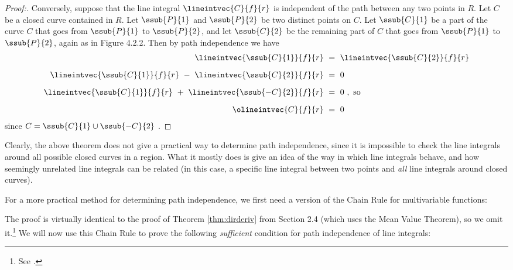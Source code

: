\begin{proof}[Proof:]
 \par\vspace{-15mm}
 Conversely, suppose that the line integral $\lineintvec{C}{f}{r}$ is independent of the path
 between any two points in $R$. Let $C$ be a closed curve contained in $R$. Let $\ssub{P}{1}$ and $\ssub{P}{2}$ be two
 distinct points on $C$. Let $\ssub{C}{1}$ be a part of the curve $C$ that goes from $\ssub{P}{1}$ to $\ssub{P}{2}$, and
 let $\ssub{C}{2}$ be the remaining part of $C$ that goes from $\ssub{P}{1}$ to $\ssub{P}{2}$, again as in Figure 4.2.2.
 Then by path independence we have
 \begin{align*}
  \lineintvec{\ssub{C}{1}}{f}{r} ~&=~ \lineintvec{\ssub{C}{2}}{f}{r}\\[6pt]
  \lineintvec{\ssub{C}{1}}{f}{r} ~-~ \lineintvec{\ssub{C}{2}}{f}{r} ~&=~ 0\\[6pt]
  \lineintvec{\ssub{C}{1}}{f}{r} ~+~ \lineintvec{\ssub{-C}{2}}{f}{r} ~&=~ 0 ~,~\text{so}\\[6pt]
  \olineintvec{C}{f}{r} ~&=~ 0
 \end{align*}
 since $C = \ssub{C}{1} \cup \ssub{-C}{2}$ . 
 \vspace{-3mm}
\end{proof}

Clearly, the above theorem does not give a practical way to determine path independence, since it is impossible to
check the line integrals around all possible closed curves in a region.
What it mostly does is give an idea of the
way in which line integrals behave, and how seemingly unrelated line integrals can be related (in this case, a
specific line integral between two points and \emph{all} line integrals around closed curves).

For a more practical method for determining path independence, we first need a version of the Chain Rule for
multivariable functions:

The proof is virtually identical to the proof of Theorem \ref{thm:dirderiv} from Section 2.4 (which uses the Mean
Value Theorem), so we omit it.\footnote{See \cite[\S\,6.5]{tm}.} We will now use this Chain Rule to prove the
following \emph{sufficient} condition for path independence of line integrals:

